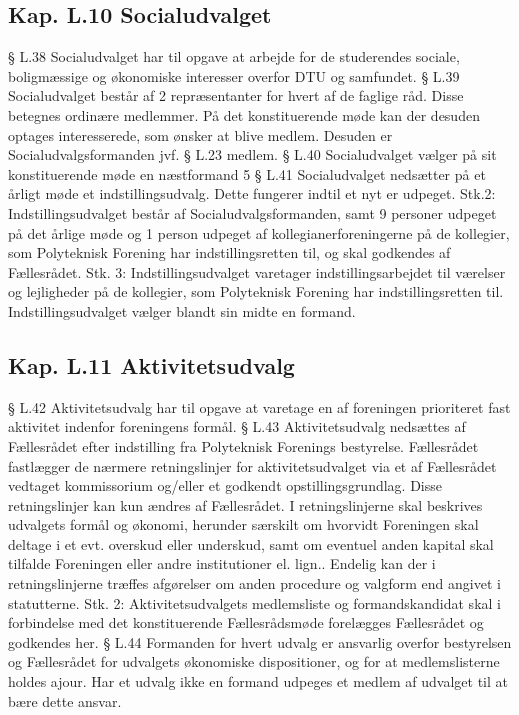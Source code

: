 \begin{list}
\subsection{Kap. L.10 Socialudvalget}
§ L.38 Socialudvalget har til opgave at arbejde for de studerendes sociale, boligmæssige og økonomiske interesser
         overfor DTU og samfundet.
§ L.39 Socialudvalget består af 2 repræsentanter for hvert af de faglige råd. Disse betegnes ordinære medlemmer.
           På det konstituerende møde kan der desuden optages interesserede, som ønsker at blive medlem.
             Desuden er Socialudvalgsformanden jvf. § L.23 medlem.
§ L.40 Socialudvalget vælger på sit konstituerende møde en næstformand
5
§ L.41
Socialudvalget nedsætter på et årligt møde et indstillingsudvalg. Dette fungerer indtil et nyt er udpeget.
Stk.2: Indstillingsudvalget består af Socialudvalgsformanden, samt 9 personer udpeget på det årlige møde og
1 person udpeget af kollegianerforeningerne på de kollegier, som Polyteknisk Forening har indstillingsretten
til, og skal godkendes af Fællesrådet.
Stk. 3: Indstillingsudvalget varetager indstillingsarbejdet til værelser og lejligheder på de kollegier, som
Polyteknisk Forening har indstillingsretten til.
Indstillingsudvalget vælger blandt sin midte en formand.
\subsection{Kap. L.11 Aktivitetsudvalg}
§ L.42 Aktivitetsudvalg har til opgave at varetage en af foreningen prioriteret fast aktivitet indenfor foreningens
       formål.
§ L.43 Aktivitetsudvalg nedsættes af Fællesrådet efter indstilling fra Polyteknisk Forenings bestyrelse. Fællesrådet
            fastlægger de nærmere retningslinjer for aktivitetsudvalget via et af Fællesrådet vedtaget kommissorium
               og/eller et godkendt opstillingsgrundlag. Disse retningslinjer kan kun ændres af Fællesrådet. I
                 retningslinjerne skal beskrives udvalgets formål og økonomi, herunder særskilt om hvorvidt Foreningen skal
                   deltage i et evt. overskud eller underskud, samt om eventuel anden kapital skal tilfalde Foreningen eller andre
                  institutioner el. lign.. Endelig kan der i retningslinjerne træffes afgørelser om anden procedure og valgform
                   end angivet i statutterne.
Stk. 2: Aktivitetsudvalgets medlemsliste og formandskandidat skal i forbindelse med det konstituerende
Fællesrådsmøde forelægges Fællesrådet og godkendes her.
§ L.44
Formanden for hvert udvalg er ansvarlig overfor bestyrelsen og Fællesrådet for udvalgets økonomiske
dispositioner, og for at medlemslisterne holdes ajour. Har et udvalg ikke en formand udpeges et medlem af
udvalget til at bære dette ansvar.

\end{list}
